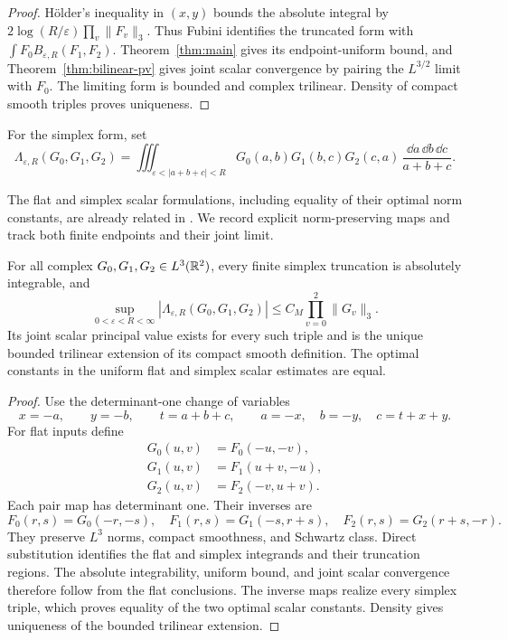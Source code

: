 \begin{proof}
H\"older's inequality in $(x,y)$ bounds the absolute integral by
$2\log(R/\varepsilon)\prod_v\|F_v\|_3$.
Thus Fubini identifies the truncated form with
$\int F_0 B_{\varepsilon,R}(F_1,F_2)$.
Theorem~\ref{thm:main} gives its endpoint-uniform bound, and
Theorem~\ref{thm:bilinear-pv} gives joint scalar convergence by pairing
the $L^{3/2}$ limit with $F_0$.  The limiting form is bounded and
complex trilinear.  Density of compact smooth triples proves uniqueness.
\end{proof}

For the simplex form, set
\[
 \Lambda_{\varepsilon,R}(G_0,G_1,G_2)
 =\iiint_{\varepsilon<|a+b+c|<R}
 G_0(a,b)G_1(b,c)G_2(c,a)
 \,\frac{\dd a\,\dd b\,\dd c}{a+b+c}.
\]

The flat and simplex scalar formulations, including equality of their
optimal norm constants, are already related in
\cite[Appendix~B.1]{KovacThieleZorinKranich2015}. We record explicit
norm-preserving maps and track both finite endpoints and their joint limit.

\begin{proposition}\label{prop:flat-equivalence}
For all complex $G_0,G_1,G_2\in L^3(\mathbb R^2)$, every finite simplex
truncation is absolutely integrable, and
\[
 \sup_{0<\varepsilon<R<\infty}
 |\Lambda_{\varepsilon,R}(G_0,G_1,G_2)|
 \le C_M\prod_{v=0}^2\|G_v\|_3.
\]
Its joint scalar principal value exists for every such triple and is
the unique bounded trilinear extension of its compact smooth definition.
The optimal constants in the uniform flat and simplex scalar estimates
are equal.
\end{proposition}

\begin{proof}
Use the determinant-one change of variables
\[
 x=-a,\qquad y=-b,\qquad t=a+b+c,
 \qquad
 a=-x,\quad b=-y,\quad c=t+x+y.
\]
For flat inputs define
\[
 \begin{aligned}
 G_0(u,v)&=F_0(-u,-v),\\
 G_1(u,v)&=F_1(u+v,-u),\\
 G_2(u,v)&=F_2(-v,u+v).
 \end{aligned}
\]
Each pair map has determinant one.  Their inverses are
\[
 F_0(r,s)=G_0(-r,-s),\quad
 F_1(r,s)=G_1(-s,r+s),\quad
 F_2(r,s)=G_2(r+s,-r).
\]
They preserve $L^3$ norms, compact smoothness, and Schwartz class.
Direct substitution identifies the flat and simplex integrands and
their truncation regions.  The absolute integrability, uniform bound,
and joint scalar convergence therefore follow from the flat conclusions.
The inverse maps realize every simplex triple, which proves equality
of the two optimal scalar constants.  Density gives uniqueness of the
bounded trilinear extension.
\end{proof}

